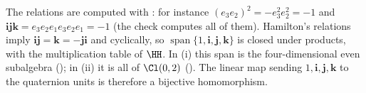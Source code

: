 The relations are computed with : for instance $(e_3 e_2)^{2} = -e_3^{2} e_2^{2} = -1$ and $\mathbf{i}\mathbf{j}\mathbf{k} = e_3 e_2 e_1 e_3 e_2 e_1 = -1$ (the check computes all of them). Hamilton's relations imply $\mathbf{i}\mathbf{j} = \mathbf{k} = -\mathbf{j}\mathbf{i}$ and cyclically, so $\operatorname{span}\{1, \mathbf{i}, \mathbf{j}, \mathbf{k}\}$ is closed under products, with the multiplication table of $\HH$. In (i) this span is the four-dimensional even subalgebra (); in (ii) it is all of $\Cl(0,2)$ (). The linear map sending $1, \mathbf{i}, \mathbf{j}, \mathbf{k}$ to the quaternion units is therefore a bijective homomorphism.
